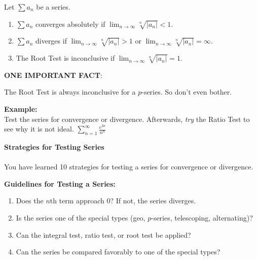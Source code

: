 \newpage

\begin{tcolorbox}[title= THE ROOT TEST,colframe=black,sharp corners,colback=white,colbacktitle=white,coltitle=black]

    Let
    $\displaystyle\sum a_n$ be a series.
    \begin{enumerate}
        \item $\displaystyle\sum a_n$ converges absolutely if $\displaystyle\lim_{n\to\infty}\sqrt[n]{\left|a_n\right|}<1$.
        \item $\displaystyle\sum a_n$ diverges if $\displaystyle\lim_{n\to\infty}\sqrt[n]{\left|a_n\right|}>1$ or $\displaystyle\lim_{n\to\infty}\sqrt[n]{\left|a_n\right|}=\infty$.
        \item The Root Test is inconclusive if $\displaystyle\lim_{n\to\infty}\sqrt[n]{\left|a_n\right|}=1$.
    \end{enumerate}

\end{tcolorbox}
\vspace{.1in}

\noindent\textbf{ONE IMPORTANT FACT}:
\begin{questions}
    \question The Root Test is always inconclusive for a $p$-series. So don't even bother.
\end{questions}
\vspace{.1in}
\noindent\textbf{Example:}\\
Test the series for convergence or divergence. Afterwards, \textit{try} the Ratio Test to see why it is not ideal.
$\displaystyle\sum_{n=1}^\infty \frac{e^{2n}}{n^n}$


\newpage

\noindent\textbf{\Large Strategies for Testing Series}\\
\\
You have learned 10 strategies for testing a series for convergence or divergence. 

\textbf{Guidelines for Testing a Series:}
\begin{enumerate}
    \item Does the $n$th term approach 0? If not, the series diverges.
    \item Is the series one of the special types (geo, $p$-series, telescoping, alternating)?
    \item Can the integral test, ratio test, or root test be applied?
    \item Can the series be compared favorably to one of the special types?
\end{enumerate}


